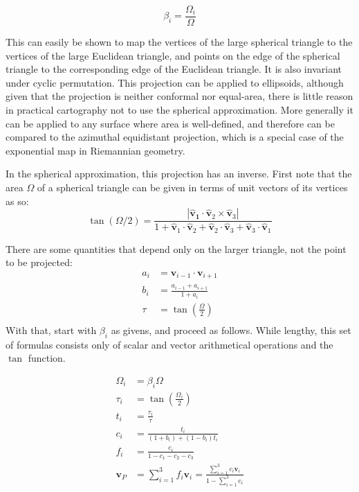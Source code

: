 \documentclass{amsart}[12pt]
\begin{document}
\begin{equation}\label{eq:sphericalarealfwd}
	\beta_i = \frac{\Omega_i}{\Omega}
\end{equation}

This can easily be shown to map the vertices of the large spherical triangle to the vertices of the large Euclidean triangle, and points on the edge of the spherical triangle to the corresponding edge of the Euclidean triangle. It is also invariant under cyclic permutation. This projection can be applied to ellipsoids, although given that the projection is neither conformal nor equal-area, there is little reason in practical cartography not to use the spherical approximation. More generally it can be applied to any surface where area is well-defined, and therefore can be compared to the azimuthal equidistant projection, which is a special case of the exponential map in Riemannian geometry.

In the spherical approximation, this projection has an inverse. First note that the area $\Omega$ of a spherical triangle can be given in terms of unit vectors of its vertices as so:\cite{oosterom}\cite{eriksson}
\begin{equation}
\tan(\Omega/2) = \frac{|\mathbf{\hat{v}_1} \cdot
       \mathbf{\hat{v}}_2 \times \mathbf{\hat{v}}_3|}
       {1+\mathbf{\hat{v}}_1\cdot \mathbf{\hat{v}}_2+\mathbf{\hat{v}}_2
       \cdot \mathbf{\hat{v}}_3+\mathbf{\hat{v}}_3\cdot \mathbf{\hat{v}}_1}
\end{equation}

There are some quantities that depend only on the larger triangle, not the point to be projected:
\begin{equation}\begin{split}		
		a_i & = \mathbf v_{i-1} \cdot \mathbf v_{i+1} \\
		b_i & = \frac{a_{i-1} + a_{i+1}}{1 + a_i}\\
		\tau &= \tan\left(\frac{\Omega}{2}\right) \\
\end{split}\end{equation}
With that, start with $\beta_i$ as givens, and proceed as follows. While lengthy, this set of formulas consists only of scalar and vector arithmetical operations and the $\tan$ function.

\begin{equation}\label{eq:sphericalarealinv}\begin{split}		
\Omega_i & = \beta_i \Omega \\	
\tau_i &= \tan\left(\frac{\Omega_i}{2}\right) \\
t_i &= \frac{\tau_i}{\tau} \\
c_i &= \frac{t_i}{(1+b_i) + (1-b_i) t_i} \\
f_i &= \frac{c_i}{1 - c_1 - c_2 - c_3} \\
\mathbf v_P &= \sum^3_{i=1} f_i \mathbf v_i = \frac{\sum^3_{i=1} c_i \mathbf v_i }{ 1 - \sum^3_{i=1} c_i }
\end{split}\end{equation}
\end{document}
